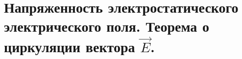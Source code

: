 \section{Напряженность электростатического электрического поля. Теорема о циркуляции вектора $\vec{E}$.}